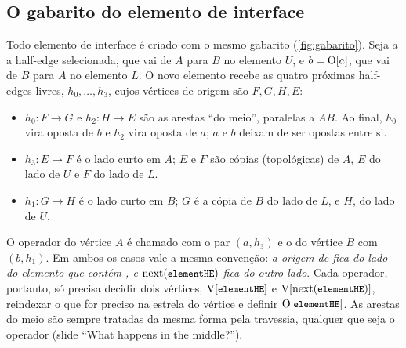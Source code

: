 \subsection{O gabarito do elemento de interface}
\label{sec:gabarito}

Todo elemento de interface é criado com o mesmo gabarito (\cref{fig:gabarito}). Seja $a$ a half-edge selecionada, que
vai de $A$ para $B$ no elemento $U$, e $b=\mathrm{O}[a]$, que vai de $B$ para $A$ no elemento $L$. O novo elemento recebe as
quatro próximas half-edges livres, $h_0,\dots,h_3$, cujos vértices de origem são $F,G,H,E$:
\begin{itemize}
\item $h_0: F\to G$ e $h_2: H\to E$ são as arestas ``do meio'', paralelas a $AB$. Ao final, $h_0$ vira oposta de $b$ e
$h_2$ vira oposta de $a$; $a$ e $b$ deixam de ser opostas entre si.
\item $h_3: E\to F$ é o lado curto em $A$; $E$ e $F$ são cópias (topológicas) de $A$, $E$ do lado de $U$ e $F$ do lado
de $L$.
\item $h_1: G\to H$ é o lado curto em $B$; $G$ é a cópia de $B$ do lado de $L$, e $H$, do lado de $U$.
\end{itemize}
O operador do vértice $A$ é chamado com o par $(a, h_3)$ e o do vértice $B$ com $(b, h_1)$. Em ambos os casos vale a
mesma convenção: \emph{a origem de  fica do lado do elemento que contém , e
$\mathrm{next}(\text{\texttt{\small elementHE}})$ fica do outro lado}. Cada operador, portanto, só precisa decidir dois vértices,
$\mathrm{V}[\text{\texttt{\small elementHE}}]$ e $\mathrm{V}[\mathrm{next}(\text{\texttt{\small elementHE}})]$, reindexar o que for preciso na estrela do vértice
e definir $\mathrm{O}[\text{\texttt{\small elementHE}}]$. As arestas do meio são sempre tratadas da mesma forma pela travessia, qualquer
que seja o operador (slide ``What happens in the middle?'').

